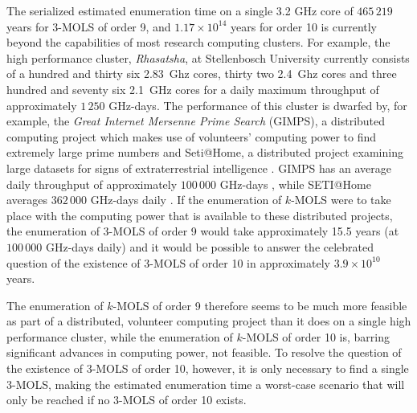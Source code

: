 \documentclass[11pt, a4paper]{article}
\begin{document}
The serialized estimated enumeration time on a single 3.2 GHz core of $465\,219$ years for $3$-MOLS of order 9, and $1.17\times 10^{14}$ years for order 10 is currently beyond  the capabilities of most research computing clusters. For example, the high performance cluster, \emph{Rhasatsha}, at Stellenbosch University currently consists of a hundred and thirty six  2.83~Ghz cores, thirty two 2.4~Ghz cores and three hundred and seventy six 2.1~GHz cores for a daily maximum throughput of approximately $1\,250$ GHz-days. The performance of this cluster is dwarfed by, for example, the \emph{Great Internet Mersenne Prime Search} (GIMPS),  a distributed computing project which makes use of volunteers' computing power to find extremely large prime numbers \cite{gimps} and Seti@Home,  a distributed project examining large datasets for signs of extraterrestrial intelligence \cite{seti}. GIMPS has an average daily throughput of approximately $100\,000$ GHz-days \cite{gimps}, while SETI@Home averages   $362\,000$ GHz-days daily \cite{seti}. If the enumeration of $k$-MOLS were to take place with the computing power that is available to these distributed projects, the enumeration of $3$-MOLS of order 9 would take approximately 15.5 years (at $100\,000$ GHz-days daily) and it would be possible to answer the celebrated question of the existence of $3$-MOLS of order 10 in approximately $3.9\times 10^{10}$ years.

The enumeration of $k$-MOLS of order 9 therefore seems to be much more feasible as part of a distributed, volunteer computing project than it does   on a single high performance cluster, while the enumeration of $k$-MOLS of order 10 is, barring significant advances in computing power, not feasible.  To resolve the question of  the existence of $3$-MOLS of order 10, however, it is only necessary to find a single $3$-MOLS, making the estimated enumeration time a worst-case scenario that will only be reached if no $3$-MOLS of order 10 exists.
\end{document}
